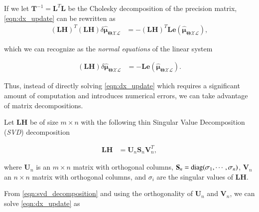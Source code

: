 If we let $\mathbf{T}^{-1}=\mathbf{L}^T\mathbf{L}$ be the Cholesky
decomposition of the precision matrix, \eqref{eqn:dx_update} can be rewritten as
\begin{equation}\label{eqn:dx_update_normal}
  \begin{aligned}
  (\mathbf{L}\mathbf{H})^T(\mathbf{L}\mathbf{H})
    \delta\hat{\boldsymbol{\mu}}_{\boldsymbol{\Theta}\mathcal{X}\mathcal{L}} &= 
    -(\mathbf{L}\mathbf{H})^T\mathbf{L}
    \mathbf{e}(\mathbf{\hat{\boldsymbol{\mu}}_{
    \boldsymbol{\Theta}\mathcal{X}\mathcal{L}}}),
  \end{aligned}
\end{equation}

\noindent which we can recognize as the \emph{normal equations} of the linear
system

\begin{equation}\label{eqn:dx_update_standard}
  \begin{aligned}
  (\mathbf{L}\mathbf{H})
    \delta\hat{\boldsymbol{\mu}}_{\boldsymbol{\Theta}\mathcal{X}\mathcal{L}} &=
    -\mathbf{L}\mathbf{e}(
    \mathbf{\hat{\boldsymbol{\mu}}_{
    \boldsymbol{\Theta}\mathcal{X}\mathcal{L}}}).
  \end{aligned}
\end{equation}

Thus, instead of directly solving \eqref{eqn:dx_update} which requires a
significant amount of computation and introduces numerical errors, we can take
advantage of matrix decompositions.

Let $\mathbf{L}\mathbf{H}$ be of size $m\times n$ with the following thin
Singular Value Decomposition (\emph{SVD}) decomposition~\cite{golub96matrix}

\begin{equation}\label{eqn:svd_decomposition}
  \begin{aligned}
  \mathbf{L}\mathbf{H} &= \mathbf{U}_n\mathbf{S}_n\mathbf{V}_n^T,
  \end{aligned}
\end{equation}

\noindent where $\mathbf{U}_n$ is an $m\times n$ matrix with orthogonal columns,
$\mathbf{S}_n=\operatorname{diag}(\sigma_1, \cdots,\sigma_n)$, $\mathbf{V}_n$ an $n\times n$
matrix with orthogonal columns, and $\sigma_i$ are the
singular values of $\mathbf{L}\mathbf{H}$.

From \eqref{eqn:svd_decomposition} and using the orthogonality of
$\mathbf{U}_n$ and $\mathbf{V}_n$, we can solve \eqref{eqn:dx_update} as

